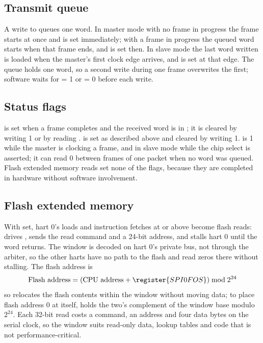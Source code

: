 \subsection{Transmit queue}

A write to  queues one word. In master mode with no frame in progress the frame starts at once and  is set immediately; with a frame in progress the queued word starts when that frame ends, and  is set then. In slave mode the last word written is loaded when the master's first clock edge arrives, and  is set at that edge. The queue holds one word, so a second write during one frame overwrites the first; software waits for  = 1 or  = 0 before each write.

\subsection{Status flags}

 is set when a frame completes and the received word is in ; it is cleared by writing 1 or by reading .  is set as described above and cleared by writing 1.  is 1 while the master is clocking a frame, and in slave mode while the chip select is asserted; it can read 0 between frames of one packet when no word was queued. Flash extended memory reads set none of the flags, because they are completed in hardware without software involvement.

\subsection{Flash extended memory} \label{ss:spi-flash-xip}

With  set, hart 0's loads and instruction fetches at or above \texttt{\FlashBaseAddress} become flash reads:  drives , sends the read command and a 24-bit address, and stalls hart 0 until the word returns. The window is decoded on hart 0's private bus, not through the arbiter, so the other harts have no path to the flash and read zeros there without stalling. The flash address is
\begin{equation*}
\text{Flash address} = (\text{CPU address} + \register{SPI0FOS}) \bmod 2^{24}
\end{equation*}
so  relocates the flash contents within the window without moving data; to place flash address 0 at \texttt{\FlashBaseAddress} itself,  holds the two's complement of the window base modulo $2^{24}$. Each 32-bit read costs a command, an address and four data bytes on the serial clock, so the window suits read-only data, lookup tables and code that is not performance-critical.

